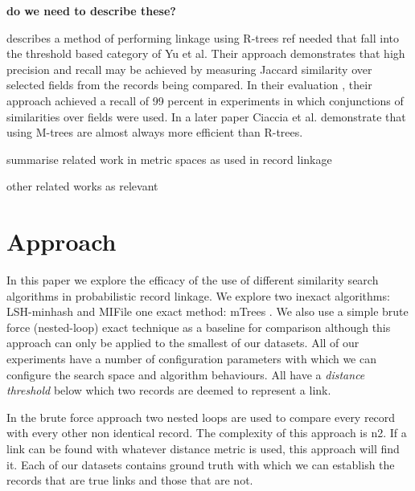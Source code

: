 \documentclass{llncs}
\begin{document}
{\textbf{do we need to describe these?}}

 \cite{Li2006} describes a method of performing linkage using R-trees {ref needed} that fall into the threshold based category of Yu et al. Their approach demonstrates that high precision and recall may be achieved by measuring Jaccard similarity over selected fields from the records being compared. In their evaluation , their approach achieved a recall of 99 percent in experiments in which conjunctions of similarities over fields were used. In a later paper \cite{Ciaccia97indexingmetric}  Ciaccia et al. demonstrate that using M-trees are almost always more efficient than R-trees.

summarise related work in metric spaces as used in record linkage

other related works as relevant




\section{Approach}
\label{sec-approach}

In this paper we explore the efficacy of the use of different similarity search algorithms in probabilistic record linkage. We explore two inexact algorithms: LSH-minhash and MIFile \cite{amato2014mi} one exact method: mTrees \cite{paolociaccia2m}. We also use a simple brute force (nested-loop) exact technique as a baseline for comparison although this approach can only be applied to the smallest of our datasets. All of our experiments have a number of configuration parameters with which we can configure the search space and algorithm behaviours. All have a \textit{distance threshold} below which two records are deemed to represent a link.

In the brute force approach two nested loops are used to compare every record with every other non identical record. The complexity of this approach is n2. If a link can be found with whatever distance metric is used, this approach will find it. Each of our datasets contains ground truth with which we can establish the records that are true links and those that are not. 
\end{document}
